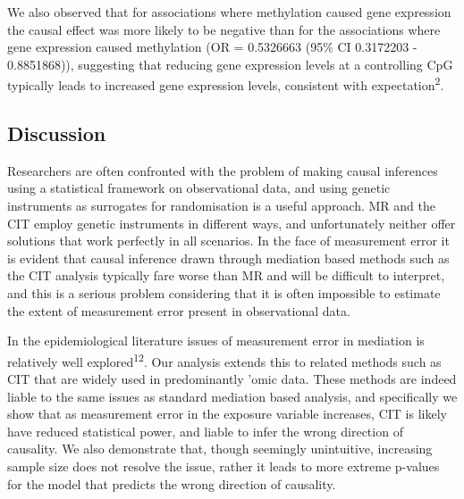 \documentclass[]{article}
\begin{document}
We also observed that for associations where methylation caused gene
expression the causal effect was more likely to be negative than for the
associations where gene expression caused methylation (OR = 0.5326663
(95\% CI 0.3172203 - 0.8851868)), suggesting that reducing gene
expression levels at a controlling CpG typically leads to increased gene
expression levels, consistent with expectation\textsuperscript{2}.

\subsection{Discussion}\label{discussion}

Researchers are often confronted with the problem of making causal
inferences using a statistical framework on observational data, and
using genetic instruments as surrogates for randomisation is a useful
approach. MR and the CIT employ genetic instruments in different ways,
and unfortunately neither offer solutions that work perfectly in all
scenarios. In the face of measurement error it is evident that causal
inference drawn through mediation based methods such as the CIT analysis
typically fare worse than MR and will be difficult to interpret, and
this is a serious problem considering that it is often impossible to
estimate the extent of measurement error present in observational data.

In the epidemiological literature issues of measurement error in
mediation is relatively well explored\textsuperscript{12}. Our analysis
extends this to related methods such as CIT that are widely used in
predominantly 'omic data. These methods are indeed liable to the same
issues as standard mediation based analysis, and specifically we show
that as measurement error in the exposure variable increases, CIT is
likely have reduced statistical power, and liable to infer the wrong
direction of causality. We also demonstrate that, though seemingly
unintuitive, increasing sample size does not resolve the issue, rather
it leads to more extreme p-values for the model that predicts the wrong
direction of causality.
\end{document}
